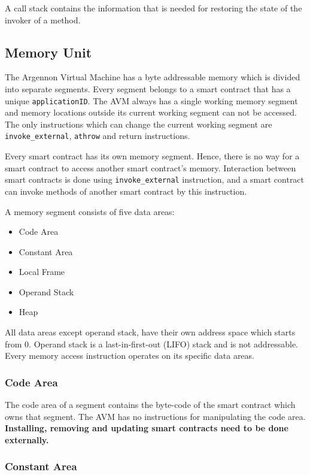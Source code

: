 \documentclass[11pt, A4]{report}
\begin{document}
    A call stack contains the information that is needed for restoring the state of the invoker of a method.

    \subsection{Memory Unit}\label{subsec:memory-unit}

    The Argennon Virtual Machine has a byte addressable memory which is divided into separate segments. Every segment
    belongs to a smart contract that has a unique \texttt{applicationID}. The AVM always has a single working memory
    segment and memory locations outside its current working segment can not be accessed. The only instructions which
    can change the current working segment are \texttt{invoke\_external}, \texttt{athrow} and return instructions.

    Every smart contract has its own memory segment. Hence, there is no way for a smart contract to access another
    smart contract's memory. Interaction between smart contracts is done using \texttt{invoke\_external} instruction,
    and a smart contract can invoke methods of another smart contract by this instruction.

    A memory segment consists of five data areas:
    \begin{itemize}
        \item Code Area
        \item Constant Area
        \item Local Frame
        \item Operand Stack
        \item Heap
    \end{itemize}
    All data areas except operand stack, have their own address space which starts from 0. Operand stack is a
    last-in-first-out (LIFO) stack and is not addressable. Every memory access instruction operates on its specific
    data areas.

    \subsubsection{Code Area}

    The code area of a segment contains the byte-code of the smart contract which owns that segment. The AVM has no
    instructions for manipulating the code area. \textbf{Installing, removing and updating smart contracts need to
    be done externally.}

    \subsubsection{Constant Area}
\end{document}
